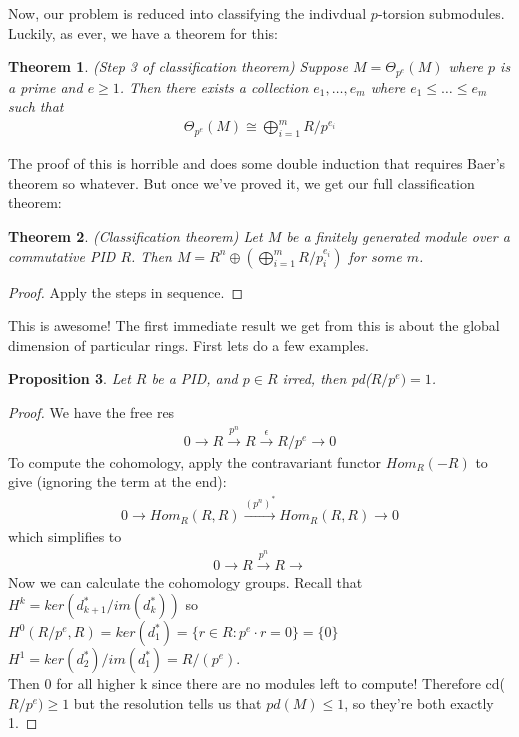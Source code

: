 \documentclass[12pt]{book}
\newtheorem{theorem}{Theorem}[chapter]
\newtheorem{proposition}[theorem]{Proposition}
\theoremstyle{definition}
\begin{document}
Now, our problem is reduced into classifying the indivdual $p$-torsion submodules. Luckily, as ever, we have a theorem for this: 

\begin{theorem}(Step 3 of classification theorem)
    Suppose $M = \Theta_{p^e}(M)$ where $p$ is a prime and $e \geq 1$. Then there exists a collection $e_1, \dots, e_m$ where $e_1 \leq \dots \leq e_m$ such that 
    \begin{align*}
        \Theta_{p^e}(M) \cong \bigoplus^{m}_{i=1} R/p^{e_i}
    \end{align*}
\end{theorem}

The proof of this is horrible and does some double induction that requires Baer's theorem so whatever. But once we've proved it, we get our full classification theorem: 

\begin{theorem}
    (Classification theorem) Let $M$ be a finitely generated module over a commutative PID $R$. Then $M = R^n \oplus (\bigoplus^{m}_{i = 1} R/p_i^{e_i})$ for some $m$. 
\end{theorem}
\begin{proof}
    Apply the steps in sequence. 
\end{proof}

This is awesome! The first immediate result we get from this is about the global dimension of particular rings. First lets do a few examples. 

\begin{proposition}
    Let $R$ be a PID, and $p \in R$ irred, then pd($R/{p^{e}}) = 1$.
\end{proposition}
\begin{proof}
    We have the free res
    \begin{align*}
        0 \rightarrow R \xrightarrow{p^n} R \xrightarrow{\epsilon} R/{p^e} \rightarrow 0 
    \end{align*}
    To compute the cohomology, apply the contravariant functor $Hom_R(-R)$ to give (ignoring the term at the end):
    \begin{align*}
        0 \rightarrow Hom_R(R,R) \xrightarrow{(p^n)^*} Hom_R(R,R) \rightarrow 0
    \end{align*}
    which simplifies to
    \begin{align*}
        0 \rightarrow R \xrightarrow{p^n} R \rightarrow
    \end{align*}
    Now we can calculate the cohomology groups. Recall that $H^k = ker(d^*_{k+1}/im(d^*_k))$ so $H^0(R/{p^e},R) = ker(d^*_1) = \{r \in R: p^e \cdot r = 0\} = \{0\}$\\
    $H^1 = ker(d^*_2)/im(d^*_1) = R/(p^e)$. \\
    Then 0 for all higher k since there are no modules left to compute! Therefore cd($R/{p^{e}}) \geq 1$ but the resolution tells us that $pd(M) \leq 1$, so they're both exactly 1. 
\end{proof}
\end{document}
